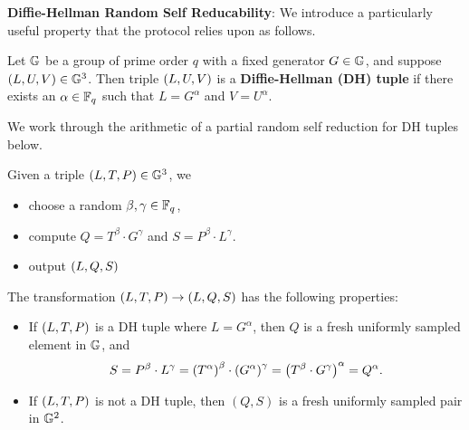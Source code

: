 \noindent \textbf{Diffie-Hellman Random Self Reducability}: We introduce a particularly useful property that the protocol relies upon as follows.
\begin{definition}
\label{def:dh_tup}
 Let $ \mathbb{G} $ be a group of prime order $q$ with a fixed generator $G \in \mathbb{G}$, and suppose $\left(L, U, V\right) \in \mathbb{G}^3$. Then triple $\left(L,U,V\right)$ is a \textbf{Diffie-Hellman (DH) tuple} if there exists an $\alpha \in \mathbb{F}_q$ such that $L = G^\alpha$ and $V = U^\alpha$.
 \end{definition} 
\noindent
We work through the arithmetic of a partial random self reduction for DH tuples below. 
\begin{definition}
Given a triple $\left(L, T, P\right) \in \mathbb{G}^3$, we
\begin{itemize}
	\item choose a random $\beta, \gamma \in \mathbb{F}_q$,
	\item compute $Q = T^\beta \cdot G^\gamma$ and $S = P^\beta \cdot L^\gamma$.
	\item output $\left(L,Q,S\right)$
\end{itemize}
\end{definition}
\noindent
The transformation $\left(L, T, P\right) \to \left(L, Q, S\right)$ has the following properties:
\begin{itemize}
	\item If $\left(L, T, P\right)$ is a DH tuple where $L = G^\alpha$, then $Q$ is a fresh uniformly sampled element in $\mathbb{G}$, and 
	\begin{align*}
	S =  P^\beta \cdot L^\gamma = \left(T^\alpha\right)^\beta \cdot \left(G^\alpha\right)^\gamma =  \left(T^\beta \cdot G^\gamma\right)^\alpha = Q^\alpha.
	\end{align*}
	\item If $\left(L, T, P\right)$ is not a DH tuple, then  $(Q,S)$ is a fresh uniformly sampled pair in $\mathbb{G}^2$.
\end{itemize}

